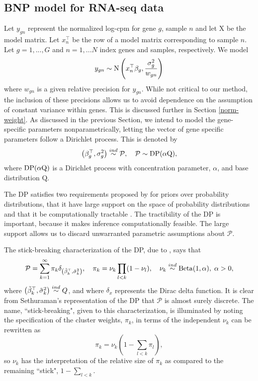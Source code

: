 \subsection{BNP model for RNA-seq data}
\label{sec:model}
Let $y_{gn}$ represent the normalized log-cpm for gene $g$, sample $n$ and let X be the model matrix. Let $x_{n}^\top$ be the row of a model matrix corresponding to sample $n$. Let $g=1,...,G$ and $n=1,...N$ index genes and samples, respectively. We model
\begin{equation}
y_{gn} \sim \operatorname{N} \left( x_{n}^\top \beta_g, \frac{\sigma^2_g}{w_{gn}} \right)
\end{equation}
where $w_{gn}$ is a given relative precision for $y_{gn}$. While not critical to our method, the inclusion of these precisions allows us to avoid dependence on the assumption of constant variance within genes. This is discussed further in Section \ref{norm-weight}. As discussed in the previous Section, we intend to model the gene-specific parameters nonparametrically, letting the vector of gene specific parameters follow a Dirichlet process. This is denoted by
\begin{equation}
\left(\beta_g^\top,\sigma^2_g\right) \stackrel{ind}{\sim} \mathcal{P},\quad \mathcal{P} \sim \operatorname{DP}(\alpha \mbox{Q}),
\end{equation}
where $\operatorname{DP}(\alpha \mbox{Q})$ is a Dirichlet process with concentration parameter, $\alpha$, and base distribution $\mbox{Q}$.

The DP satisfies two requirements proposed by \citet{ferguson} for priors over probability distributions, that it have large support on the space of probability distributions and that it be computationally tractable \citep{ferguson}. The tractibility of the DP is important, because it makes inference computationally feasible. The large support allows us to discard unwarranted parametric assumptions about $\mathcal{P}$.

The stick-breaking characterization of the DP, due to \citet{sethuraman}, says that 
\begin{equation}
\label{dp-def}
\mathcal{P} =\sum_{k=1}^\infty \pi_k \delta_{\left(\tilde{\beta}_k^\top ,\tilde{\sigma}^2_k\right)},\quad \pi_k = \nu_k \prod_{l<k}(1-\nu_l), \quad 
\nu_k \stackrel{ind}{\sim} \operatorname{Beta}(1, \alpha),\; \alpha>0,
\end{equation}
where $\left(\tilde{\beta}_k^\top ,\tilde{\sigma}^2_k\right) \stackrel{ind}{\sim} Q$, and where $\delta_{x}$ represents the Dirac delta function. It is clear from Sethuraman's representation of the DP that $\mathcal{P}$ is almost surely discrete. The name, ``stick-breaking", given to this characterization, is illuminated by noting the specification of the cluster weights, $\pi_k$, in terms of the independent $\nu_k$ can be rewritten as
\begin{equation}
\label{eq:pi}
\pi_k = \nu_k\left(1-\sum_{l<k}\pi_l\right),
\end{equation} so $\nu_k$ has the interpretation of the relative size of $\pi_k$ as compared to the remaining ``stick", $1-\sum_{l<k}$.

